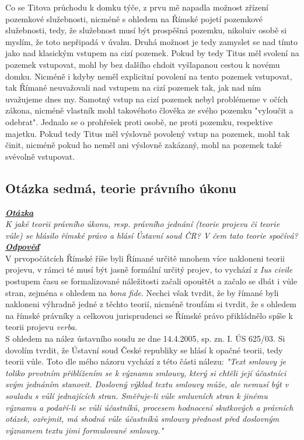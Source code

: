 \documentclass{article}
\begin{document}
Co se Titova průchodu k domku týče, z prvu mě napadla možnost zřízení pozemkové služebnosti, nicméně s ohledem na Římské pojetí pozemkové služebnosti, tedy, že služebnost musí být prospěšná pozemku, nikoluiv osobě si myslím, že toto nepřipadá v úvahu. Druhá možnost je tedy zamyslet se nad tímto jako nad klasickým vstupem na cizí pozemek. Pokud by tedy Titus měl svolení na pozemek vstupovat, mohl by bez dalšího chdoit vyšlapanou cestou k novému domku. Nicméně i kdyby neměl explicitní povolení na tento pozemek vstupovat, tak Římané neuvažovali nad vstupem na cizí pozemek tak, jak nad ním uvažujeme dnes my. Samotný vstup na cizí pozemek nebyl problémeme v očích zákona, nicméně vlastník mohl takovéhoto člověka ze svého pozemku "vyloučit a odebrat". Jednalo se o prohřešek proti osobě, ne proti pozemku, respektive majetku. Pokud tedy Titus měl výslovně povolený vstup na pozemek, mohl tak činit, nicméně pokud ho neměl ani výslovně zakázaný, mohl na pozemek také svévolně vstupovat.

\subsection{Otázka sedmá, teorie právního úkonu}
\textbf{\textit{\underline{Otázka}}}\\
\textit{K jaké teorii právního úkonu, resp. právního jednání (teorie projevu či teorie vůle) se hlásilo římské právo a hlásí Ústavní soud ČR? V čem tato teorie spočívá?}\\

\noindent\noindent\textbf{\textit{\underline{Odpověď}}}\\

V prvopočátcích Římské říše byli Římané určitě mnohem více nakloneni teorii projevu, v rámci té musí být jasně formální určitý projev, to vychází z \textit{Ius civile} postupem času se formalizované náležitosti začali opouštět a začalo se dbát i vůle stran, zejména s ohledem na \textit{bona fide}. Nechci však tvrdit, že by římané byli nakloneni výhradně jedné z těchto teorií, nicméně troufám si tvrdit, že s ohledem na římské právníky a celkovou jurisprudenci se Římské právo přikládnělo spíše k teorii projevu \textit{verba}.\\

S ohledem na nález ústavního soudu ze dne 14.4.2005, sp. zn. I. ÚS 625/03. Si dovolím tvrdit, že Ústavní soud České republiky se hlásí k opačné teorii, tedy teorii vůle. Toto dle mého názoru vychází z této části nálezu: \textit{"Text smlouvy je toliko prvotním přiblížením se k významu smlouvy, který si chtěli její účastníci svým jednáním stanovit. Doslovný výklad textu smlouvy může, ale nemusí být v souladu s vůlí jednajících stran. Směřuje-li vůle smluvních stran k jinému významu a podaří-li se vůli účastníků, procesem hodnocení skutkových a právních otázek, ozřejmit, má shodná vůle účastníků smlouvy přednost před doslovným významem textu jimi formulované smlouvy."}\\ 
\end{document}
